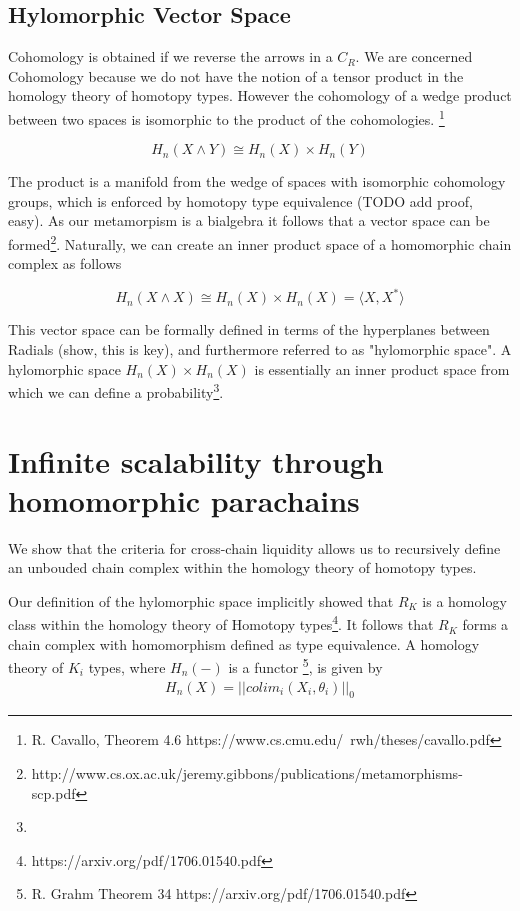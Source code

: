 \documentclass{article}
\begin{document}
\subsection{Hylomorphic Vector Space}
Cohomology is obtained if we reverse the arrows in a $C_R$. We are concerned Cohomology because we do not have the notion of a tensor product in the homology theory of homotopy types. However the cohomology of a wedge product between two spaces is isomorphic to the product of the cohomologies. \footnote{R. Cavallo, Theorem 4.6 https://www.cs.cmu.edu/~rwh/theses/cavallo.pdf}

\begin{equation} \label{eq1}
H_n(X \wedge Y) \cong H_n(X) \times H_n(Y)
\end{equation}

The product is a manifold from the wedge of spaces with isomorphic cohomology groups, which is enforced by homotopy type equivalence (TODO add proof, easy). As our metamorpism is a bialgebra it follows that a vector space can be formed\footnote{http://www.cs.ox.ac.uk/jeremy.gibbons/publications/metamorphisms-scp.pdf}. Naturally, we can create an inner product space of a homomorphic chain complex as follows

\begin{equation} \label{eq1}
H_n(X \wedge X) \cong H_n(X) \times H_n(X) = \langle X, X^* \rangle
\end{equation}

This vector space can be formally defined in terms of the hyperplanes between Radials (show, this is key), and furthermore referred to as "hylomorphic space". A hylomorphic space $H_n(X) \times H_n(X)$ is essentially an inner product space from which we can define a probability\footnote{}.

\section{Infinite scalability through homomorphic parachains}
We show that the criteria for cross-chain liquidity allows us to recursively define an unbouded chain complex within the homology theory of homotopy types.

Our definition of the hylomorphic space implicitly showed that $R_K$ is a homology class within the homology theory of Homotopy types\footnote{https://arxiv.org/pdf/1706.01540.pdf}. It follows that $R_K$ forms a chain complex with homomorphism defined as type equivalence. A homology theory of $K_i$ types, where $H_n(-)$ is a functor \footnote{R. Grahm Theorem 34 https://arxiv.org/pdf/1706.01540.pdf}, is given by 
\begin{equation} \label{eq1}
\begin{split}
H_n(X) = || colim_i (X_i,\theta_i) ||_0
\end{split}
\end{equation}
\end{document}
